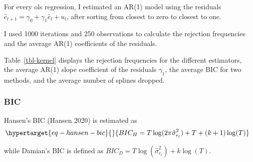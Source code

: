 \documentclass[
]{article}
\begin{document}
For every ols regression, I estimated an AR(1) model using the residuals
\(\hat{e}_{l+1}=\gamma_0+\gamma_1 \hat{e}_l + u_l\), after sorting from
closest to zero to closest to one.

I used 1000 iterations and 250 observations to calculate the rejection
frequencies and the average AR(1) coefficients of the residuals.

Table~\ref{tbl-kernel} displays the rejection frequencies for the
different estimators, the average AR(1) slope coefficient of the
residuals \(\gamma_1\), the average BIC for two methods, and the average
number of splines dropped.

\hypertarget{bic}{%
\subsubsection{BIC}\label{bic}}

Hansen's BIC (Hansen 2020) is estimated as
\begin{equation}\protect\hypertarget{eq-hansen-bic}{}{
BIC_H=T\log(2\pi\hat{\sigma}^2_{e_l})+T+(k+1)\log(T)
}\label{eq-hansen-bic}\end{equation}

while Damian's BIC is defined as
\(BIC_D=T\log(\hat{\sigma}^2_{e_l})+k\log(T)\).
\end{document}
